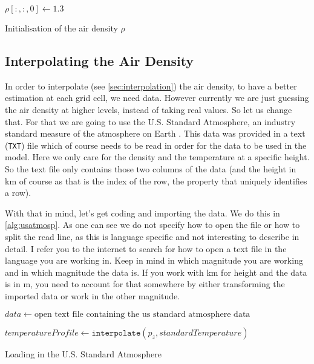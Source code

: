 \begin{algorithm}
    $\rho[:, :, 0] \leftarrow 1.3$ \;
    \caption{Initialisation of the air density $\rho$}
    \label{alg:density}
\end{algorithm}

\subsection{Interpolating the Air Density} \label{sec:usatmosp}
In order to interpolate (see \autoref{sec:interpolation}) the air density, to have a better estimation at each grid cell, we need data. However currently we are just guessing the air density at 
higher levels, instead of taking real values. So let us change that. For that we are going to use the U.S. Standard Atmosphere, an industry standard measure of the atmosphere on Earth 
\cite{usatmosp}. This data was provided in a text (\texttt{TXT}) file which of course needs to be read in order for the data to be used in the model. Here we only care for the density and the 
temperature at a specific height. So the text file only contains those two columns of the data (and the height in km of course as that is the index of the row, the property that uniquely 
identifies a row).

With that in mind, let's get coding and importing the data. We do this in \autoref{alg:usatmosp}. As one can see we do not specify how to open the file or how to split the read line, as this 
is language specific and not interesting to describe in detail. I refer you to the internet to search for how to open a text file in the language you are working in. Keep in mind in which 
magnitude you are working and in which magnitude the data is. If you work with \si{km} for height and the data is in \si{m}, you need to account for that somewhere by either transforming the imported 
data or work in the other magnitude. 

\begin{algorithm}
    $data \leftarrow \text{open text file containing the us standard atmosphere data}$ \;

    $temperatureProfile \leftarrow \texttt{interpolate}(p_z, standardTemperature)$ \;

    \caption{Loading in the U.S. Standard Atmosphere}
    \label{alg:usatmosp}
\end{algorithm}

